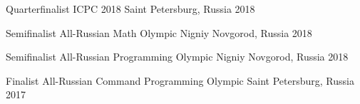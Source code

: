 



\begin{cvhonors}

  \cvhonor
    {Quarterfinalist} %
    {ICPC 2018} %
    {Saint Petersburg, Russia} %
    {2018} %

\end{cvhonors}




\begin{cvhonors}

  \cvhonor
    {Semifinalist} %
    {All-Russian Math Olympic} %
    {Nigniy Novgorod, Russia} %
    {2018} %

  \cvhonor
    {Semifinalist} %
    {All-Russian Programming Olympic} %
    {Nigniy Novgorod, Russia} %
    {2018} %

  \cvhonor
    {Finalist} %
    {All-Russian Command Programming Olympic} %
    {Saint Petersburg, Russia} %
    {2017} %

\end{cvhonors}

